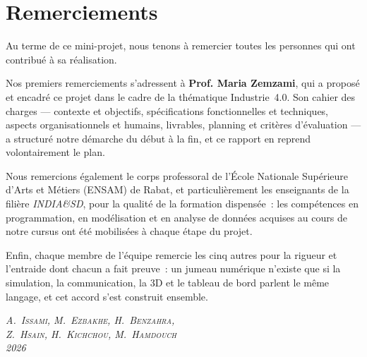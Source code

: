 \chapter*{Remerciements}
\thispagestyle{plain}

Au terme de ce mini-projet, nous tenons à remercier toutes les personnes qui ont contribué à sa réalisation.

Nos premiers remerciements s'adressent à \textbf{Prof. Maria Zemzami}, qui a proposé et encadré ce projet dans le cadre de la thématique Industrie~4.0. Son cahier des charges --- contexte et objectifs, spécifications fonctionnelles et techniques, aspects organisationnels et humains, livrables, planning et critères d'évaluation --- a structuré notre démarche du début à la fin, et ce rapport en reprend volontairement le plan.

Nous remercions également le corps professoral de l'École Nationale Supérieure d'Arts et Métiers (\ac{ENSAM}) de Rabat, et particulièrement les enseignants de la filière \textit{INDIA\&SD}, pour la qualité de la formation dispensée~: les compétences en programmation, en modélisation et en analyse de données acquises au cours de notre cursus ont été mobilisées à chaque étape du projet.

Enfin, chaque membre de l'équipe remercie les cinq autres pour la rigueur et l'entraide dont chacun a fait preuve~: un jumeau numérique n'existe que si la simulation, la communication, la \ac{3D} et le tableau de bord parlent le même langage, et cet accord s'est construit ensemble.

\vspace{1.5cm}
\begin{flushright}
\textit{A.~\textsc{Issami}, M.~\textsc{Ezbakhe}, H.~\textsc{Benzahra},}\\
\textit{Z.~\textsc{Hsain}, H.~\textsc{Kichchou}, M.~\textsc{Hamdouch}}\\
\textit{2026}
\end{flushright}
